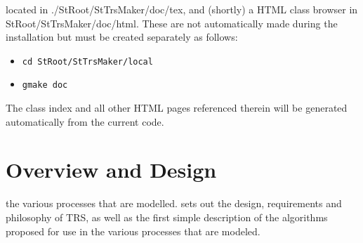 \documentclass[twoside]{article}
\newcommand{\name}[1]{\textsf{#1}}%
\newcommand{\comp}[1]{\texttt{#1}}%
\begin{document}
located in \name{./StRoot/StTrsMaker/doc/tex}, and (shortly) 
a \name{HTML} class browser in
\name{StRoot/StTrsMaker/doc/html}.
These are not automatically made during the
installation but must be created separately as follows:
\begin{itemize}
  \item \comp{cd StRoot/StTrsMaker/local}
  \item \comp{gmake doc}
\end{itemize}

The class index and all other \name{HTML} pages referenced therein 
will be generated automatically from the current code. 

     
\section{Overview and Design}  
\label{sec:design}

the various processes that are modelled.
sets out the design, requirements and philosophy of \name{TRS}, as well as
the first simple description of the algorithms proposed for use in
the various processes that are modeled.
\end{document}
